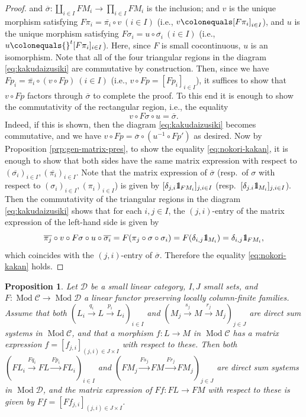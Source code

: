 \documentclass{surv-l}
\numberwithin{equation}{chapter}
\numberwithin{figure}{chapter}
\theoremstyle{plain}
\newtheorem{prp}[thm]{Proposition}
\theoremstyle{definition}
\theoremstyle{remark}
\newcommand{\id}{1\kern-.25em{\text{{\rm l}}}}
\DeclareMathOperator{\Mod}{Mod}
\begin{document}
\begin{proof}
and $\overline{\sigma} \colon \coprod_{i\in I}FM_i \to \prod_{i\in I}FM_i$ is the inclusion; and
$v$ is the unique morphism satisfying $F\pi_i = \overline{\pi_i} \circ v \ (i\in I)$
(i.e., $v\colonequals  [F\pi_i]_{i\in I}$), and $u$ is the unique morphism satisfying $F\sigma_i = u \circ \overline{\sigma_i} \ (i \in I)$
(i.e., $u\colonequals  {}^t[F\pi_i]_{i\in I}$). Here, since $F$ is small cocontinuous, $u$ is an isomorphism.
Note that all of the four triangular regions in the diagram \eqref{eq:kakudaizusiki}
are commutative by construction. Then, since we have
$Fp_i = \overline{\pi_i} \circ (v \circ Fp) \ (i\in I)$
(i.e., $v \circ Fp = [Fp_i]_{i\in I}$), it suffices to show that
$v \circ Fp$ factors through $\overline{\sigma}$ to complete the proof.
To this end it is enough to show the commutativity of the rectangular region, i.e., the equality
\begin{equation}\label{eq:nokori-kakan}
v \circ F\sigma \circ u = \overline{\sigma}.
\end{equation}
Indeed, if this is shown, then the diagram \eqref{eq:kakudaizusiki} becomes commutative,
and we have $v \circ Fp = \overline{\sigma} \circ (u^{-1} \circ Fp')$ as desired.
Now by Proposition \ref{prp:gen-matrix-pres},
to show the equality \eqref{eq:nokori-kakan}, it is enough to show that
 both sides have the same matrix expression with respect to $(\overline{\sigma_i})_{i\in I}, (\overline{\pi_i})_{i\in I}$.
Note that the matrix expression of $\overline{\sigma}$
(resp.\ of $\sigma$ with respect to $(\sigma_i)_{i\in I}, (\pi_i)_{i\in I}$) is given by
$[\delta_{j,i}\id_{FM_i}]_{j,i\in I}$
(resp.\ $[\delta_{j.i}\id_{M_i}]_{j,i\in I}$).
Then the commutativity of the triangular regions in the diagram \eqref{eq:kakudaizusiki} shows that
for each $i, j\in I$, the $(j,i)$-entry of the matrix expression of the left-hand side
is given by
\[
\overline{\pi_j} \circ v \circ F\sigma \circ u \circ \overline{\sigma_i}
= F(\pi_j \circ \sigma \circ \sigma_i) = F(\delta_{i,j}\id_{M_i}) = \delta_{i,j}\id_{FM_i},
\]
which coincides with the $(j,i)$-entry of $\overline{\sigma}$.
Therefore the equality \eqref{eq:nokori-kakan} holds.
\end{proof}

\begin{prp}\label{prp:fun-matrix}
Let ${\mathcal{D}}$ be a small linear category, $I, J$ small sets, and $F \colon \Mod{\mathcal{C}} \to \Mod{\mathcal{D}}$
a linear functor preserving locally column-finite families.
Assume that both $(L_i \xrightarrow{q_i} L \xrightarrow{p_i} L_i)_{i \in I}$ and $(M_j \xrightarrow{s_j} M \xrightarrow{r_j} M_j)_{j \in J}$
are direct sum systems in $\Mod{\mathcal{C}}$, and that a morphism $f \colon L \to M$
in $\Mod{\mathcal{C}}$ has a matrix expression
$f = [f_{j,i}]_{(j,i)\in J \times I}$ with respect to these.
Then both
$(FL_i \xrightarrow{Fq_i} FL \xrightarrow{Fp_i} FL_i)_{i \in I}$ and $(FM_j \xrightarrow{Fs_j} FM \xrightarrow{Fr_j} FM_j)_{j \in J}$
are direct sum systems in $\Mod{\mathcal{D}}$, and the matrix expression of
$Ff \colon FL \to FM$ with respect to these is given by
$Ff = [Ff_{j,i}]_{(j,i)\in J \times I}$.
\end{prp}
\end{document}
